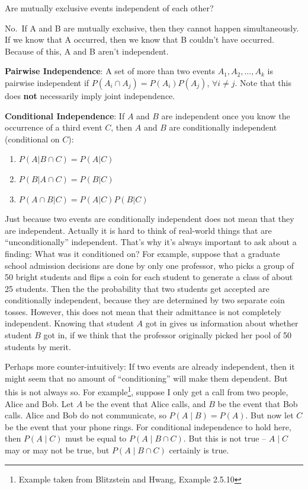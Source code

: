 \documentclass[
]{book}
\providecommand{\tightlist}{%
  \setlength{\itemsep}{0pt}\setlength{\parskip}{0pt}}
\theoremstyle{definition}
\theoremstyle{definition}
\theoremstyle{definition}
\theoremstyle{remark}
\begin{document}
Are mutually exclusive events independent of each other?

No.~If A and B are mutually exclusive, then they cannot happen simultaneously. If we know that A occurred, then we know that B couldn't have occurred. Because of this, A and B aren't independent.

\textbf{Pairwise Independence}: A set of more than two events \(A_1, A_2, \dots, A_k\) is pairwise independent if \(P(A_i\cap A_j)=P(A_i)P(A_j)\), \(\forall i\neq j\). Note that this does \textbf{not} necessarily imply joint independence.

\textbf{Conditional Independence}: If \(A\) and \(B\) are independent once you know the occurrence of a third event \(C\), then \(A\) and \(B\) are conditionally independent (conditional on \(C\)):

\begin{enumerate}
\def\labelenumi{\arabic{enumi}.}
\tightlist
\item
  \(P(A|B \cap C)=P(A|C)\)
\item
  \(P(B|A \cap C)=P(B|C)\)
\item
  \(P(A\cap B|C)=P(A|C)P(B|C)\)
\end{enumerate}

Just because two events are conditionally independent does not mean that they are independent. Actually it is hard to think of real-world things that are ``unconditionally'' independent. That's why it's always important to ask about a finding: What was it conditioned on? For example, suppose that a graduate school admission decisions are done by only one professor, who picks a group of 50 bright students and flips a coin for each student to generate a class of about 25 students. Then the the probability that two students get accepted are conditionally independent, because they are determined by two separate coin tosses. However, this does not mean that their admittance is not completely independent. Knowing that student \(A\) got in gives us information about whether student \(B\) got in, if we think that the professor originally picked her pool of 50 students by merit.

Perhaps more counter-intuitively: If two events are already independent, then it might seem that no amount of ``conditioning'' will make them dependent. But this is not always so. For example\footnote{Example taken from Blitzstein and Hwang, Example 2.5.10}, suppose I only get a call from two people, Alice and Bob. Let \(A\) be the event that Alice calls, and \(B\) be the event that Bob calls. Alice and Bob do not communicate, so \(P(A \mid B) = P(A).\) But now let \(C\) be the event that your phone rings. For conditional independence to hold here, then \(P(A \mid C)\) must be equal to \(P(A \mid B \cap C).\) But this is not true -- \(A \mid C\) may or may not be true, but \(P(A \mid B \cap C)\) certainly is true.
\end{document}
